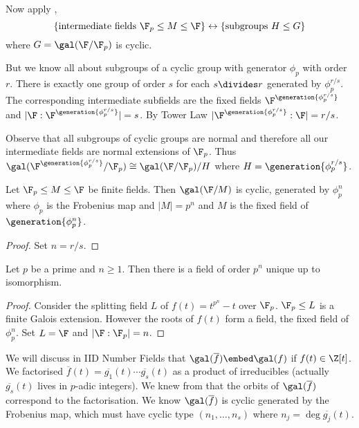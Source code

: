 \documentclass[a4paper]{article}
\newcommand*{\red}[1]{\overline{#1}}
\begin{document}
Now apply ,
\[
  \{\text{intermediate fields } \F_p \leq M \leq \F\} \leftrightarrow \{\text{subgroups } H \leq G \}
\]
where \(G = \gal(\F/\F_p)\) is cyclic.

But we know all about subgroups of a cyclic group with generator \(\phi_p\) with order \(r\). There is exactly one group of order \(s\) for each \(s \divides r\) generated by \(\phi_p^{r/s}\). The corresponding intermediate subfields are the fixed fields \(\F^{\generation{\phi_p^{r/s}}}\) and \(|\F:\F^{\generation{\phi_p^{r/s}}}| = s\). By Tower Law \(|\F^{\generation{\phi_p^{r/s}}}:\F| = r/s\).

Observe that all subgroups of cyclic groups are normal and therefore all our intermediate fields are normal extensions of \(\F_p\). Thus \(\gal(\F^{\generation{\phi_p^{r/s}}}/\F_p) \cong \gal(\F/\F_p)/H\) where \(H = \generation{\phi_p^{r/s}}\).

\begin{corollary}
  \label{cor:galois group of finite fields}
  Let \(\F_p \leq M \leq \F\) be finite fields. Then \(\gal(\F/M)\) is cyclic, generated by \(\phi_p^n\) where \(\phi_p\) is the Frobenius map and \(|M| = p^n\) and \(M\) is the fixed field of \(\generation{\phi_p^n}\).
\end{corollary}

\begin{proof}
  Set \(n = r/s\).
\end{proof}

\begin{theorem}
  Let \(p\) be a prime and \(n \geq 1\). Then there is a field of order \(p^n\) unique up to isomorphism.
\end{theorem}

\begin{proof}
  Consider the splitting field \(L\) of \(f(t) = t^{p^n} - t\) over \(\F_p\). \(\F_p \leq L\) is a finite Galois extension. However the roots of \(f(t)\) form a field, the fixed field of \(\phi_p^n\). Set \(L = \F\) and \(|\F:\F_p| = n\).
\end{proof}

\begin{remark}
  \label{rmk:mod p reduction}
  We will discuss in IID Number Fields that \(\gal(\red f) \embed \gal(f)\) if \(f(t) \in \Z[t]\). We factorised \(\red f(t) = \red{g_1}(t)\cdots \red{g_s}(t)\) as a product of irreducibles (actually \(\red{g_s}(t)\) lives in \(p\)-adic integers). We knew from  that the orbits of \(\gal(\red f)\) correspond to the factorisation. We know \(\gal(\red f)\) is cyclic generated by the Frobenius map, which must have cyclic type \((n_1, \dots, n_s)\) where \(n_j = \deg \red{g_j}(t)\).
\end{remark}
\end{document}
